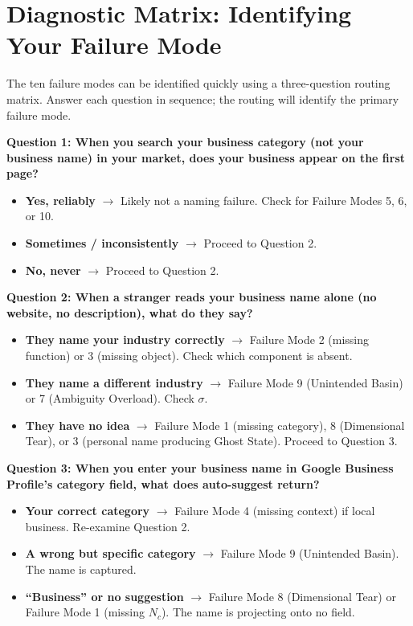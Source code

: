 \documentclass[12pt, openany]{book}
\theoremstyle{thmstyle}
\theoremstyle{defstyle}
\begin{document}
\section{Diagnostic Matrix: Identifying Your Failure Mode}

The ten failure modes can be identified quickly using a three-question routing matrix. Answer each question in sequence; the routing will identify the primary failure mode.

\begin{diagbox}
\textbf{Question 1: When you search your business category (not your business name) in your market, does your business appear on the first page?}

\begin{itemize}[leftmargin=1.5em]
  \item \textbf{Yes, reliably} $\to$ Likely not a naming failure. Check for Failure Modes 5, 6, or 10.
  \item \textbf{Sometimes / inconsistently} $\to$ Proceed to Question 2.
  \item \textbf{No, never} $\to$ Proceed to Question 2.
\end{itemize}

\textbf{Question 2: When a stranger reads your business name alone (no website, no description), what do they say?}

\begin{itemize}[leftmargin=1.5em]
  \item \textbf{They name your industry correctly} $\to$ Failure Mode 2 (missing function) or 3 (missing object). Check which component is absent.
  \item \textbf{They name a different industry} $\to$ Failure Mode 9 (Unintended Basin) or 7 (Ambiguity Overload). Check $\sigma$.
  \item \textbf{They have no idea} $\to$ Failure Mode 1 (missing category), 8 (Dimensional Tear), or 3 (personal name producing Ghost State). Proceed to Question 3.
\end{itemize}

\textbf{Question 3: When you enter your business name in Google Business Profile's category field, what does auto-suggest return?}

\begin{itemize}[leftmargin=1.5em]
  \item \textbf{Your correct category} $\to$ Failure Mode 4 (missing context) if local business. Re-examine Question 2.
  \item \textbf{A wrong but specific category} $\to$ Failure Mode 9 (Unintended Basin). The name is captured.
  \item \textbf{``Business'' or no suggestion} $\to$ Failure Mode 8 (Dimensional Tear) or Failure Mode 1 (missing $N_c$). The name is projecting onto no field.
\end{itemize}
\end{diagbox}
\end{document}
